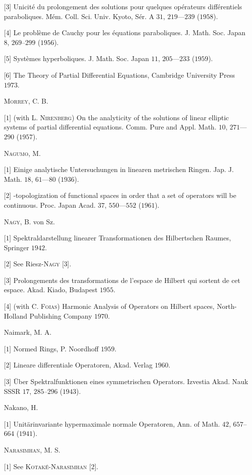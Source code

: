 [$3$] Unicité du prolongement des solutions pour quelques opérateurs différentiels paraboliques. Mém. Coll. Sci. Univ. Kyoto, Sér. A $31$, $219$---$239$ ($1958$). 

[$4$] Le problème de Cauchy pour les équations paraboliques. J. Math. Soc. Japan $8$, $269$--$299$ ($1956$). 

[$5$] Systèmes hyperboliques. J. Math. Soc. Japan $11$, $205$---$233$ ($1959$). 

[$6$] The Theory of Partial Differential Equations, Cambridge University Press $1973$. 

\textsc{Morrey}, C. B. 

[$1$] (with L. \textsc{Nirenberg}) On the analyticity of the solutions of linear elliptic systems of partial differential equations. Comm. Pure and Appl. Math. $10$, $271$---$290$ ($1957$). 

\textsc{Nagumo}, M. 

[$1$] Einige analytische Untersuchungen in linearen metrischen Ringen. Jap. J. Math. $18$, $61$---$80$ ($1936$). 

[$2$] -topologization of functional spaces in order that a set of operators will be continuous. Proc. Japan Acad. $37$, $550$---$552$ ($1961$). 

\textsc{Nagy}, B. von Sz. 

[$1$] Spektraldarstellung linearer Transformationen des Hilbertschen Raumes, Springer $1942$. 

[$2$] See Riesz-\textsc{Nagy} [$3$]. 

[$3$] Prolongements des transformations de l'espace de Hilbert qui sortent de cet espace. Akad. Kiado, Budapest $1955$. 

[$4$] (with C. \textsc{Foias}) Harmonic Analysis of Operators on Hilbert spaces, North-Holland Publishing Company $1970$. 

Naimark, M. A. 

[$1$] Normed Rings, P. Noordhoff $1959$. 

[$2$] Lineare differentiale Operatoren, Akad. Verlag $1960$. 

[$3$] Über Spektralfunktionen eines symmetrischen Operators. Izvestia Akad. Nauk SSSR $17$, $285$--$296$ ($1943$). 

Nakano, H. 

[$1$] Unitärinvariante hypermaximale normale Operatoren, Ann. of Math. $42$, $657$--$664$ ($1941$). 

\textsc{Narasimhan}, M. S. 

[$1$] See \textsc{Kotaké}-\textsc{Narasimhan} [$2$]. 

